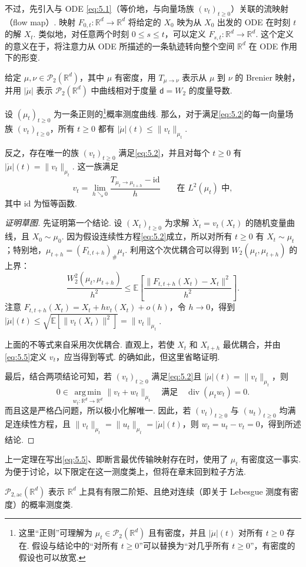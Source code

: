 不过，先引入与 ODE \eqref{eq:5.1}（等价地，与向量场族 $(v_t)_{t\geq0}$）关联的流映射（flow map）. 映射 $F_{0,t}:\mathbb R^d\to\mathbb R^d$ 将给定的 $X_0$ 映为从 $X_0$ 出发的 ODE 在时刻 $t$ 的解 $X_t$. 类似地，对任意两个时刻 $0\leq s\leq t$，可以定义 $F_{s,t}:\mathbb R^d\to\mathbb R^d$. 这个定义的意义在于，将注意力从 ODE 所描述的一条轨迹转向整个空间 $\mathbb R^d$ 在 ODE 作用下的形变.

给定 $\mu,\nu\in\mathcal P_2(\mathbb R^d)$，其中 $\mu$ 有密度，用 $T_{\mu\to\nu}$ 表示从 $\mu$ 到 $\nu$ 的 Brenier 映射，并用 $|\dot\mu|$ 表示 $\mathcal P_2(\mathbb R^d)$ 中曲线相对于度量 $\mathsf d=W_2$ 的度量导数.

\begin{theorem}\label{thm:5.3}
设 $(\mu_t)_{t\geq0}$ 为一条正则的\footnote{这里“正则”可理解为 $\mu_t\in\mathcal P_2(\mathbb R^d)$ 且有密度，并且 $|\dot\mu|(t)$ 对所有 $t\geq0$ 存在. 假设与结论中的“对所有 $t\geq0$”可以替换为“对几乎所有 $t\geq0$”，有密度的假设也可以放宽.}概率测度曲线. 那么，对于满足\eqref{eq:5.2}的每一向量场族 $(v_t)_{t\geq0}$，所有 $t\geq0$ 都有 $|\dot\mu|(t)\leq\|v_t\|_{\mu_t}$.

反之，存在唯一的族 $(v_t)_{t\geq0}$ 满足\eqref{eq:5.2}，并且对每个 $t\geq0$ 有 $|\dot\mu|(t)=\|v_t\|_{\mu_t}$. 这一族满足
\begin{equation}\label{eq:5.5}
v_t=\lim_{h\searrow0}\frac{T_{\mu_t\to\mu_{t+h}}-\mathrm{id}}{h}
\qquad\text{在 }L^2(\mu_t)\text{ 中},
\end{equation}
其中 $\mathrm{id}$ 为恒等函数.
\end{theorem}
\begin{proof}[证明草图]
先证明第一个结论. 设 $(X_t)_{t\geq0}$ 为求解 $\dot X_t=v_t(X_t)$ 的随机变量曲线，且 $X_0\sim\mu_0$. 因为假设连续性方程\eqref{eq:5.2}成立，所以对所有 $t\geq0$ 有 $X_t\sim\mu_t$；特别地，$\mu_{t+h}=(F_{t,t+h})_\#\mu_t$. 利用这个次优耦合可以得到 $W_2(\mu_t,\mu_{t+h})$ 的上界：
$$
\frac{W_2^2(\mu_t,\mu_{t+h})}{h^2}
\leq\mathbb E\left[\frac{\|F_{t,t+h}(X_t)-X_t\|^2}{h^2}\right].
$$
注意 $F_{t,t+h}(X_t)=X_t+hv_t(X_t)+o(h)$，令 $h\to0$，得到 $|\dot\mu|(t)\leq\sqrt{\mathbb E[\|v_t(X_t)\|^2]}=\|v_t\|_{\mu_t}$.

上面的不等式来自采用次优耦合. 直观上，若使 $X_t$ 和 $X_{t+h}$ 最优耦合，并由\eqref{eq:5.5}定义 $v_t$，应当得到等式. 的确如此，但这里省略证明.

最后，结合两项结论可知，若 $(v_t)_{t\geq0}$ 满足\eqref{eq:5.2}且 $|\dot\mu|(t)=\|v_t\|_{\mu_t}$，则
$$
0\in\operatorname*{arg\,min}_{w_t:\mathbb R^d\to\mathbb R^d}\|v_t+w_t\|_{\mu_t}
\quad\text{满足}\quad\operatorname{div}(\mu_tw_t)=0.
$$
而且这是严格凸问题，所以极小化解唯一. 因此，若 $(v_t)_{t\geq0}$ 与 $(u_t)_{t\geq0}$ 均满足连续性方程，且 $\|v_t\|_{\mu_t}=\|u_t\|_{\mu_t}=|\dot\mu|(t)$，则 $w_t=u_t-v_t=0$，得到所述结论.
\end{proof}

上一定理在写出\eqref{eq:5.5}、即断言最优传输映射存在时，使用了 $\mu_t$ 有密度这一事实. 为便于讨论，以下限定在这一测度类上，但将在章末回到粒子方法.

\begin{definition}\label{def:5.4}
$\mathcal P_{2,\mathrm{ac}}(\mathbb R^d)$ 表示 $\mathbb R^d$ 上具有有限二阶矩、且绝对连续（即关于 Lebesgue 测度有密度）的概率测度类.
\end{definition}
